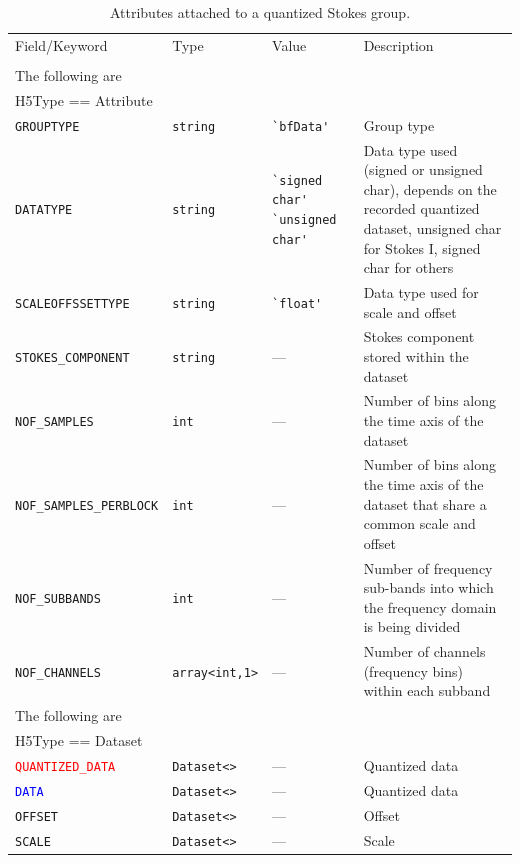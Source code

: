 \documentclass[a4paper,10pt,bibtotoc]{scrartcl}
\begin{document}
\begin{table}[htbp]
  \centering
  \begin{tabular}{|llp{3cm}p{4.5cm}|}
    \hline
    \sc Field/Keyword  & \sc Type & \sc Value & Description \\
    \sc   & \sc & \sc & \\
    \hline \hline
    \sc The following are & \sc & \sc & \\
    \sc H5Type == Attribute & \sc & \sc & \\
    \hline 
    \small{\verb|GROUPTYPE|}    & \verb|string|  & \verb|`bfData'| & Group type \\
    \small{\verb|DATATYPE |}    & \verb|string|  & \verb|`signed char'| \verb|`unsigned char'| & Data type used (signed or unsigned char), depends on the recorded quantized dataset, unsigned char for Stokes I, signed char for others \\
    \small{\verb|SCALEOFFSSETTYPE |}    & \verb|string|  & \verb|`float'| & Data type used for scale and offset \\
    \small{\verb|STOKES_COMPONENT|}  & \verb|string| & --- & Stokes component stored within the dataset \\
    \small{\verb|NOF_SAMPLES|}  & \verb|int| & --- & Number of bins along the time axis of the dataset \\
    \small{\verb|NOF_SAMPLES_PERBLOCK|}  & \verb|int| & --- & Number of bins along the time axis of the dataset that share a common scale and offset \\
    \small{\verb|NOF_SUBBANDS|}  & \verb|int| & --- & Number of frequency sub-bands into which the frequency domain is being divided \\
    \small{\verb|NOF_CHANNELS|}  & \verb|array<int,1>| & --- & Number of channels (frequency bins) within each subband \\
    \hline 
    \sc The following are & \sc & \sc & \\
    \sc H5Type == Dataset & \sc & \sc & \\
    \hline 
    \small{\textcolor{red}{\texttt{QUANTIZED\_DATA}}} & \verb|Dataset<>| & --- & Quantized data \\
    \small{\textcolor{blue}{\texttt{DATA}}} & \verb|Dataset<>| & --- & Quantized data \\
    \small{\verb|OFFSET|}  & \verb|Dataset<>| & --- & Offset \\
    \small{\verb|SCALE|}  & \verb|Dataset<>| & --- & Scale \\
    \hline 
  \end{tabular}
  \caption{Attributes attached to a quantized Stokes group.}
  \label{tab:Qstokes attributes}
\end{table}
\end{document}
